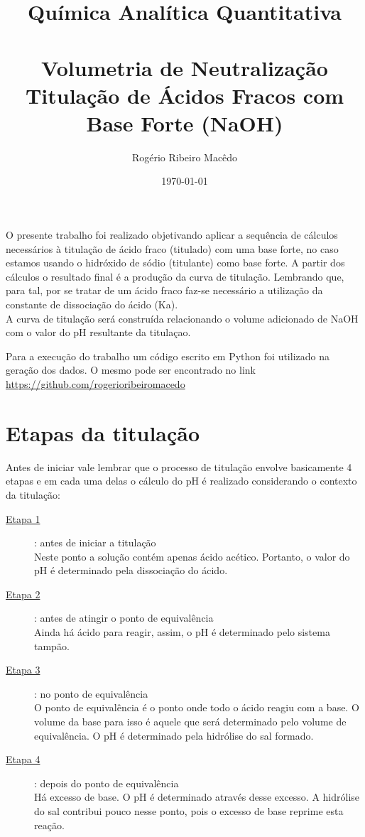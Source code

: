\documentclass[a4paper, 12pt]{article}
\title{Química Analítica Quantitativa\\
	\large{\textbf{\\Volumetria de Neutralização \\
	Titulação de Ácidos Fracos com Base Forte (NaOH)}}
}
\author{Rogério Ribeiro Macêdo}
\date{\today}
\begin{document}
\maketitle
\tableofcontents
\newpage
\listoffigures
\newpage
\listoftables
\newpage

O presente trabalho foi realizado objetivando aplicar a sequência de cálculos necessários à titulação de ácido fraco (titulado) com uma base forte, no caso estamos usando o hidróxido de sódio (titulante) como base forte. A partir dos cálculos o resultado final é a produção da curva de titulação. Lembrando que, para tal, por se tratar de um ácido fraco faz-se necessário a utilização da constante de dissociação do ácido (Ka). \\

A curva de titulação será construída relacionando o volume adicionado de NaOH com o valor do pH resultante da titulaçao. 

Para a execução do trabalho um código escrito em Python foi utilizado na geração dos dados. O mesmo pode ser encontrado no link  \href{https://github.com/rogerioribeiromacedo/quimica/tree/main/quimica_analitica}{https://github.com/rogerioribeiromacedo}

\section{Etapas da titulação}
Antes de iniciar vale lembrar que o processo de titulação envolve basicamente 4 etapas e em cada uma delas o cálculo do pH é realizado considerando o contexto da titulação:

\begin{description}
	\item[\underline{Etapa 1}]: antes de iniciar a titulação \hfil \\ Neste ponto a solução contém apenas ácido acético. Portanto, o valor do pH é determinado pela dissociação do ácido.
	\item[\underline{Etapa 2}]: antes de atingir o ponto de equivalência \hfil \\ Ainda há ácido para reagir, assim, o pH é determinado pelo sistema tampão.
	\item[\underline{Etapa 3}]: no ponto de equivalência \hfil \\ O ponto de equivalência é o ponto onde todo o ácido reagiu com a base. O volume da base para isso é aquele que será determinado pelo volume de equivalência. O pH é determinado pela hidrólise do sal formado.
	\item[\underline{Etapa 4}]: depois do ponto de equivalência \hfil \\ Há excesso de base. O pH é determinado através desse excesso. A hidrólise do sal contribui pouco nesse ponto, pois o excesso de base reprime esta reação.
\end{description}
\end{document}
